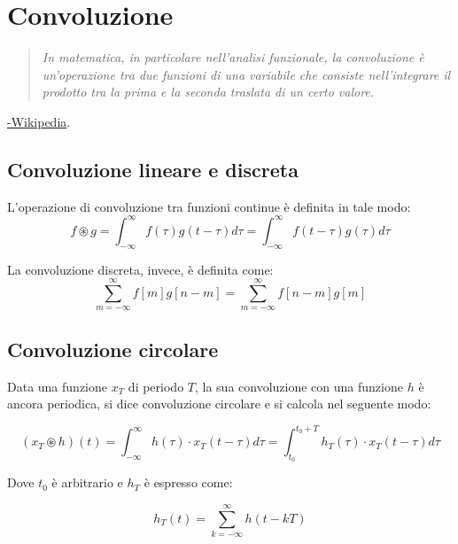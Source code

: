 \section{Convoluzione}

\begin{quote}
	\emph{In matematica, in particolare nell'analisi funzionale, la convoluzione è un'operazione tra due funzioni di una variabile che consiste nell'integrare il prodotto tra la prima e la seconda traslata di un certo valore. }
\end{quote}
\hspace*{\fill} \href{https://it.wikipedia.org/wiki/Convoluzione}{-Wikipedia}.

\subsection{Convoluzione lineare e discreta}

L'operazione di convoluzione tra funzioni continue è definita in tale modo:
\begin{equation}
	f \circledast g = \int^{\infty}_{- \infty} f(\tau)g(t-\tau)d\tau = \int^{\infty}_{- \infty} f(t - \tau)g(\tau)d\tau
\end{equation} \label{eq:conv_lineare}

La convoluzione discreta, invece, è definita come:
\begin{equation}
	\sum^{\infty}_{m= - \infty} f[m]g[n-m] = \sum^{\infty}_{m= - \infty} f[n-m]g[m] 
\end{equation} \label{eq:conv_discreta}

\subsection{Convoluzione circolare}
Data una funzione $x_T$ di periodo $T$, la sua convoluzione con una funzione $h$ è ancora periodica, si dice convoluzione circolare e si calcola nel seguente modo:

\begin{equation}
	(x_T \circledast h)(t) = \int^{ \infty }_{- \infty} h( \tau ) \cdot x_T (t - \tau ) d \tau =  \int^{ t_0 + T}_{t_0} h_T ( \tau ) \cdot x_T(t - \tau ) d \tau
\end{equation}

Dove $t_0$ è arbitrario e $h_T$ è espresso come:

\begin{equation}
	h_T(t) = \sum^{\infty}_{k= - \infty} h(t-kT)
\end{equation}

